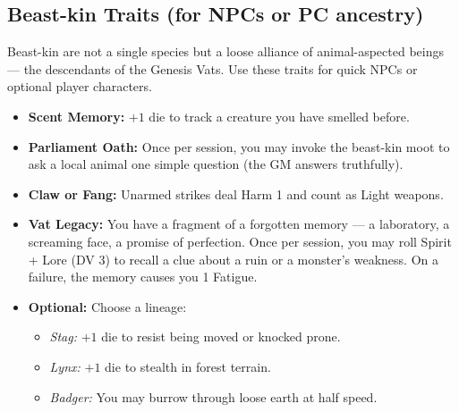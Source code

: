 \subsection*{Beast-kin Traits (for NPCs or PC ancestry)}
Beast-kin are not a single species but a loose alliance of animal-aspected beings --- the descendants of the Genesis Vats. Use these traits for quick NPCs or optional player characters.
\begin{tcolorbox}[colback=black!3,colframe=black!40!white,title=Beast-kin Traits,breakable]
\begin{itemize}
  \item \textbf{Scent Memory:} $+1$ die to track a creature you have smelled before.
  \item \textbf{Parliament Oath:} Once per session, you may invoke the beast-kin moot to ask a local animal one simple question (the GM answers truthfully).
  \item \textbf{Claw or Fang:} Unarmed strikes deal Harm 1 and count as Light weapons.
  \item \textbf{Vat Legacy:} You have a fragment of a forgotten memory --- a laboratory, a screaming face, a promise of perfection. Once per session, you may roll Spirit + Lore (DV 3) to recall a clue about a ruin or a monster's weakness. On a failure, the memory causes you 1 Fatigue.
  \item \textbf{Optional:} Choose a lineage:
  \begin{itemize}
    \item \textit{Stag:} $+1$ die to resist being moved or knocked prone.
    \item \textit{Lynx:} $+1$ die to stealth in forest terrain.
    \item \textit{Badger:} You may burrow through loose earth at half speed.
  \end{itemize}
\end{itemize}
\end{tcolorbox}

